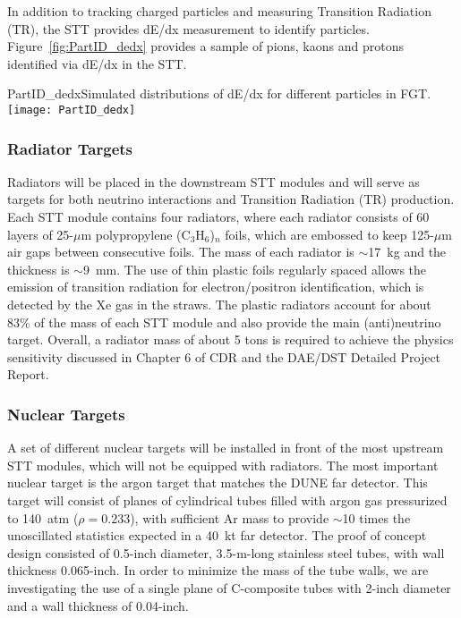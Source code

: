 In addition to tracking charged particles and measuring Transition Radiation (TR), 
the STT provides dE/dx measurement to identify particles. 
Figure~\ref{fig:PartID_dedx} provides a sample of pions, kaons and protons identified via dE/dx in the STT.
\begin{cdrfigure}
{PartID_dedx}{Simulated distributions of dE/dx for different particles in FGT.}
\texttt{[image: PartID\_dedx]}
\end{cdrfigure}

\subsubsection{Radiator Targets} 


Radiators will be placed in the downstream STT modules and will serve
as targets for both neutrino interactions and Transition Radiation
(TR) production. Each STT module contains four radiators, where each
radiator consists of 60 layers of 25-$\mu$m polypropylene
(C$_3$H$_6$)$_n$ foils, which are embossed to keep 125-$\mu$m air gaps
between consecutive foils.  The mass of each radiator is $\sim$17~kg
and the thickness is $\sim$9~mm. The use of thin plastic foils
regularly spaced allows the emission of transition radiation for
electron/positron identification, which is detected by the Xe gas in
the straws. The plastic radiators account for about 83\% of the mass of each STT module and 
also provide the main (anti)neutrino target. Overall, a radiator mass of about 5 tons 
is required to achieve the physics sensitivity discussed in 
Chapter 6 of CDR \volphys{}  %
and the DAE/DST Detailed Project Report\cite{DPR}. 

\subsubsection{Nuclear Targets} 

A set of different nuclear targets will be installed in front of the
most upstream STT modules, which will not be equipped with radiators.
The most important nuclear target is the argon target that matches
the DUNE far detector.  
This target will consist of planes of cylindrical tubes filled with 
argon gas pressurized to 140~atm ($\rho = 0.233$), with
sufficient Ar mass to provide $\sim$10 times the unoscillated
statistics expected in a 40~kt far detector. The proof of concept design 
consisted of 0.5-inch diameter, 3.5-m-long stainless steel tubes, 
with wall thickness 0.065-inch. In order to minimize the mass of the 
tube walls, we are investigating the use of a single plane of C-composite 
tubes with 2-inch diameter and a wall thickness of 0.04-inch.  

